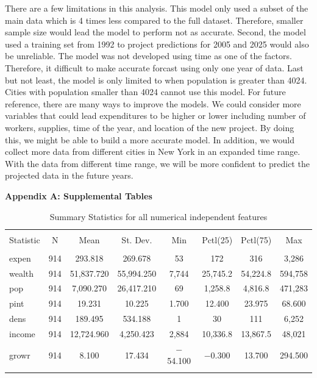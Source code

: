 \documentclass[11pt]{article}\usepackage[]{graphicx}\usepackage[]{color}
\begin{document}
\noindent There are a few limitations in this analysis. This model only used a subset of the main data which is 4 times less compared to the full dataset. Therefore, smaller sample size would lead the model to perform not as accurate. Second, the model used a training set from 1992 to project predictions for 2005 and 2025 would also be unreliable. The model was not developed using time as one of the factors. Therefore, it difficult to make accurate forcast using only one year of data. Last but not least, the model is only limited to when population is greater than 4024. Cities with population smaller than 4024 cannot use this model. For future reference, there are many ways to improve the models. We could consider more variables that could lead expenditures to be higher or lower including number of workers, supplies, time of the year, and location of the new project. By doing this, we might be able to build a more accurate model. In addition, we would collect more data from different cities in New York in an expanded time range. With the data from different time range, we will be more confident to predict the projected data in the future years.    
\hfill \break

\clearpage
\newpage
\noindent \Large{{\bf Appendix A: Supplemental Tables}}

\begin{center}

\begin{table}[H] \centering 
  \caption{Summary Statistics for all numerical independent features} 
  \label{descrips} 
\begin{tabular}{@{\extracolsep{5pt}}lccccccc} 
\\[-1.8ex]\hline 
\hline \\[-1.8ex] 
Statistic & \multicolumn{1}{c}{N} & \multicolumn{1}{c}{Mean} & \multicolumn{1}{c}{St. Dev.} & \multicolumn{1}{c}{Min} & \multicolumn{1}{c}{Pctl(25)} & \multicolumn{1}{c}{Pctl(75)} & \multicolumn{1}{c}{Max} \\ 
\hline \\[-1.8ex] 
expen & 914 & 293.818 & 269.678 & 53 & 172 & 316 & 3,286 \\ 
wealth & 914 & 51,837.720 & 55,994.250 & 7,744 & 25,745.2 & 54,224.8 & 594,758 \\ 
pop & 914 & 7,090.270 & 26,417.210 & 69 & 1,258.8 & 4,816.8 & 471,283 \\ 
pint & 914 & 19.231 & 10.225 & 1.700 & 12.400 & 23.975 & 68.600 \\ 
dens & 914 & 189.495 & 534.188 & 1 & 30 & 111 & 6,252 \\ 
income & 914 & 12,724.960 & 4,250.423 & 2,884 & 10,336.8 & 13,867.5 & 48,021 \\ 
growr & 914 & 8.100 & 17.434 & $-$54.100 & $-$0.300 & 13.700 & 294.500 \\ 
\hline \\[-1.8ex] 
\end{tabular} 
\end{table} 

\end{center} 
\end{document}

